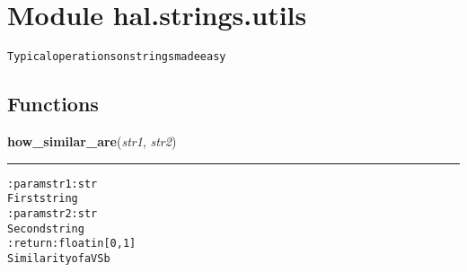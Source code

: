 %
%
%


\section{Module hal.strings.utils}

    \label{hal:strings:utils}
\begin{alltt}
Typical operations on strings made easy 
\end{alltt}



  \subsection{Functions}

    \label{hal:strings:utils:how_similar_are}

    \vspace{0.5ex}

\hspace{.8\funcindent}\begin{boxedminipage}{\funcwidth}

    \raggedright \textbf{how\_similar\_are}(\textit{str1}, \textit{str2})

    \vspace{-1.5ex}

    \rule{\textwidth}{0.5\fboxrule}
\setlength{\parskip}{2ex}
\begin{alltt}

:param str1: str
    First string
:param str2: str
    Second string
:return: float in [0, 1]
    Similarity of a VS b
\end{alltt}

\setlength{\parskip}{1ex}
    \end{boxedminipage}

